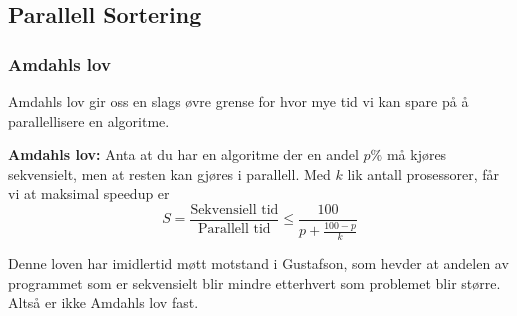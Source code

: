\subsection{Parallell Sortering}

\subsubsection{Amdahls lov}
\label{sec:amdahl}

Amdahls lov gir oss en slags øvre grense for hvor mye tid vi kan spare på å
parallellisere en algoritme.
\begin{teorem}\textbf{Amdahls lov: } 
  Anta at du har en algoritme der en andel
  $p\%$ må kjøres sekvensielt, men at resten kan gjøres i parallell.
  Med $k$ lik antall prosessorer, får vi at maksimal speedup er
  \[
    S = \frac{\text{Sekvensiell tid}}{\text{Parallell tid}} \leq \frac{100}{p + \frac{100 - p}{k}}
  \]
\end{teorem}

Denne loven har imidlertid møtt motstand i Gustafson, som hevder at andelen av
programmet som er sekvensielt blir mindre etterhvert som problemet blir større.
Altså er ikke Amdahls lov fast.

